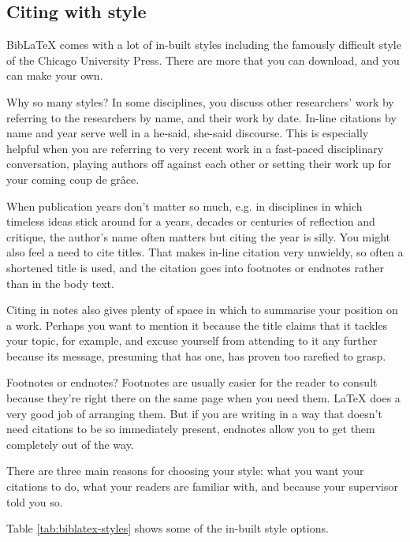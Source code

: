 \subsection{Citing with style}
\label{sec:citationstyle}

BibLaTeX comes with a lot of in-built styles including the famously difficult style of the Chicago University Press. There are more that you can download, and you can make your own.

Why so many styles?  In some disciplines, you discuss other researchers' work by referring to the researchers by name, and their work by date.  In-line citations by name and year serve well in a he-said, she-said discourse.  This is especially helpful when you are referring to very recent work in a fast-paced disciplinary conversation, playing authors off against each other or setting their work up for your coming coup de gr\^ace.

When publication years don't matter so much, e.g. in disciplines in which timeless ideas stick around for a years, decades or centuries of reflection and critique, the author's name often matters but citing the year is silly.  You might also feel a need to cite titles. That makes in-line citation very unwieldy, so often a shortened title is used, and the citation goes into footnotes or endnotes rather than in the body text.

Citing in notes also gives plenty of space in which to summarise your position on a work. Perhaps you want to mention it because the title claims that it tackles your topic, for example, and excuse yourself from attending to it any further because its message, presuming that has one, has proven too rarefied to grasp.

Footnotes or endnotes? Footnotes are usually easier for the reader to consult because they're right there on the same page when you need them.  LaTeX does a very good job of arranging them.  But if you are writing in a way that doesn't need citations to be so immediately present, endnotes allow you to get them completely out of the way.

There are three main reasons for choosing your style: what you want your citations to do, what your readers are familiar with, and because your supervisor told you so.

Table \ref{tab:biblatex-styles} shows some of the in-built style options.

